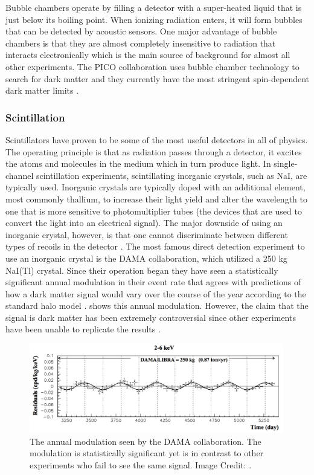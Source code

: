 Bubble chambers operate by filling a detector with a super-heated liquid that is just below its boiling point.  When ionizing radiation enters, it will form bubbles that can be detected by acoustic sensors.  One major advantage of bubble chambers is that they are almost completely insensitive to radiation that interacts electronically which is the main source of background for almost all other experiments.  The PICO collaboration uses bubble chamber technology to search for dark matter and they currently have the most stringent spin-dependent dark matter limits \cite{amole2017dark}.  

\subsubsection{Scintillation}

Scintillators have proven to be some of the most useful detectors in all of physics.  The operating principle is that as radiation passes through a detector, it excites the atoms and molecules in the medium which in turn produce light.  In single-channel scintillation experiments, scintillating inorganic crystals, such as NaI, are typically used.  Inorganic crystals are typically doped with an additional element, most commonly thallium, to increase their light yield and alter the wavelength to one that is more sensitive to photomultiplier tubes (the devices that are used to convert the light into an electrical signal).  The major downside of using an inorganic crystal, however, is that one cannot discriminate between different types of recoils in the detector \cite{undagoitia2015dark}.  The most famous direct detection experiment to use an inorganic crystal is the DAMA collaboration, which utilized a 250 kg NaI(Tl) crystal.  Since their operation began they have seen a statistically significant annual modulation in their event rate that agrees with predictions of how a dark matter signal would vary over the course of the year according to the standard halo model \cite{bernabei2010particle}.    shows this annual modulation.  However, the claim that the signal is dark matter has been extremely controversial since other experiments have been unable to replicate the results \cite{aalseth2014maximum, xmass2016direct, aprile2017search}.

\begin{figure}[t]
	\centering
	\includegraphics[width=0.99\textwidth]{dama_modulation}
	\caption{The annual modulation seen by the DAMA collaboration.  The modulation is statistically significant yet is in contrast to other experiments who fail to see the same signal. Image Credit: \cite{undagoitia2015dark}.}
	\label{fig:dama_modulation}
\end{figure}

